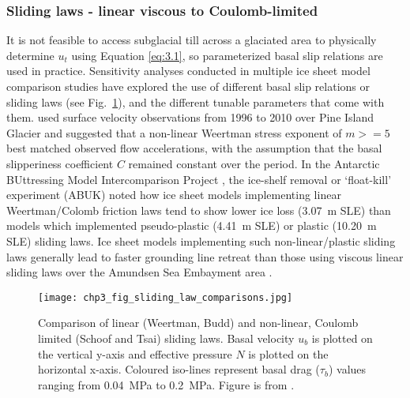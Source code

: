 \subsubsection{Sliding laws - linear viscous to Coulomb-limited}


It is not feasible to access subglacial till across a glaciated area to physically determine $u_t$ using Equation \eqref{eq:3.1}, so parameterized basal slip relations are used in practice.
Sensitivity analyses conducted in multiple ice sheet model comparison studies \citep[e.g.][]{SeroussiinitMIPAntarcticaicesheet2019,SunAntarcticicesheet2020,ZhangcomparisontwoStokes2017} have explored the use of different basal slip relations or sliding laws (see Fig.~\ref{fig:sliding_laws}), and the different tunable parameters that come with them.
\citet{Gillet-ChauletAssimilationsurfacevelocities2016} used surface velocity observations from 1996 to 2010 over Pine Island Glacier and suggested that a non-linear Weertman stress exponent of $m >= 5$ best matched observed flow accelerations, with the assumption that the basal slipperiness coefficient $C$ remained constant over the period.
In the Antarctic BUttressing Model Intercomparison Project \citep[ABUMIP;][]{SunAntarcticicesheet2020}, the ice-shelf removal or `float-kill' experiment (ABUK) noted how ice sheet models implementing linear Weertman/Colomb friction laws tend to show lower ice loss (\SI{3.07}{\metre} SLE) than models which implemented pseudo-plastic (\SI{4.41}{\metre} SLE) or plastic (\SI{10.20}{\metre} SLE) sliding laws.
Ice sheet models implementing such non-linear/plastic sliding laws generally lead to faster grounding line retreat than those using viscous linear sliding laws over the Amundsen Sea Embayment area \citep[e.g.][]{JoughinBasalconditionsPine2009,RitzPotentialsealevelrise2015,BrondexSensitivitygroundingline2017,BulthuisUncertaintyquantificationmulticentennial2019}.

\begin{figure}[htbp]
  \texttt{[image: chp3\_fig\_sliding\_law\_comparisons.jpg]}
  \caption[Comparison of Weertman, Budd, Schoof and Tsai sliding laws]{
    Comparison of linear (Weertman, Budd) and non-linear, Coulomb limited (Schoof and Tsai) sliding laws.
    Basal velocity $u_b$ is plotted on the vertical y-axis and effective pressure $N$ is plotted on the horizontal x-axis.
    Coloured iso-lines represent basal drag ($\tau_b$) values ranging from \SI{0.04}{\mega\pascal} to \SI{0.2}{\mega\pascal}.
    Figure is from \citet{BrondexSensitivitygroundingline2017}.
  }
  \label{fig:sliding_laws}
\end{figure}

